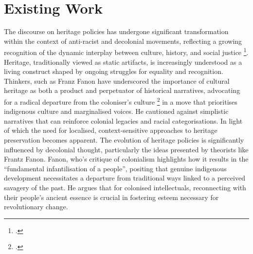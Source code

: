 \documentclass{scrartcl}
\begin{document}
\section{Existing Work}

The discourse on heritage policies has undergone significant transformation within the context of anti-racist and decolonial movements, reflecting a growing recognition of the dynamic interplay between culture, history, and social justice 
\footcite[``The letter’s main concern is a reaction to public calls for the removal of contested statues particularly of prominent figures in the British Transatlantic Slave Trade and other colonial oppression and violence, e.g. causing serious famines in India.'' ][]{tehmina_goskar_ethics_2020}.
Heritage, traditionally viewed as static artifacts, is increasingly understood as a living construct shaped by ongoing struggles for equality and recognition. Thinkers, such as Franz Fanon have underscored the importance of cultural heritage as both a product and perpetuator of historical narratives, advocating for a radical departure from the coloniser's culture 
\footcite[``The artist who has decided to illustrate the truths of the nation turns paradoxically toward the past and away from actual events. What he ultimately intends to embrace care in fact the cast-offs of thought, its shells and corpses, a knowledge which has been stabilized once and for all. But the native intellectual who wishes to create an authentic work of art must realize that the truths of a nation are in the first place its realities. He must go on until he has found the seething pot out of which the learning of the future will emerge.''][p.255]{fanon_wretched_2002} in a move that prioritises indigenous culture and marginalised voices. He cautioned against simplistic narratives that can reinforce colonial legacies and racial categorisations. 
In light of which the need for localised, context-sensitive approaches to heritage preservation becomes apparent. The evolution of heritage policies is significantly influenced by decolonial thought, particularly the ideas presented by theorists like Frantz Fanon. Fanon, who's critique of colonialism highlights how it results in the ``fundamental infantilisation of a people'', positing that genuine indigenous development necessitates a departure from traditional ways linked to a perceived savagery of the past. He argues that for colonised intellectuals, reconnecting with their people's ancient essence is crucial in fostering esteem necessary for revolutionary change. 
 
\end{document}
